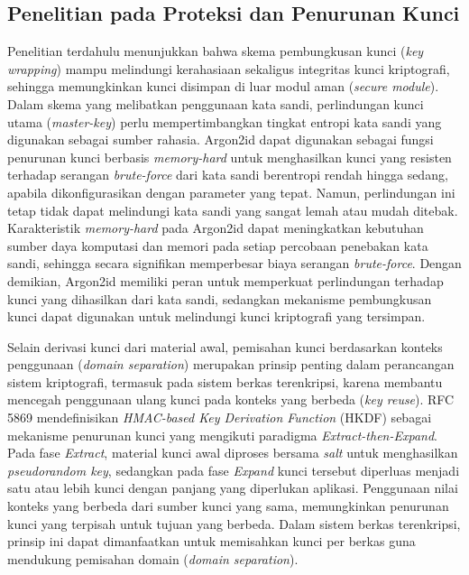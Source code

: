 \subsection{Penelitian pada Proteksi dan Penurunan Kunci}
Penelitian terdahulu menunjukkan bahwa skema pembungkusan kunci (\textit{key wrapping}) mampu melindungi kerahasiaan sekaligus integritas kunci kriptografi, sehingga memungkinkan kunci disimpan di luar modul aman (\textit{secure module})\cite{KeyBlob,cryptoeprint:2022/1499}. Dalam skema yang melibatkan penggunaan kata sandi, perlindungan kunci utama (\textit{master-key}) perlu mempertimbangkan tingkat entropi kata sandi yang digunakan sebagai sumber rahasia. Argon2id\cite{RFC9106} dapat digunakan sebagai fungsi penurunan kunci berbasis \textit{memory-hard} untuk menghasilkan kunci yang resisten terhadap serangan \textit{brute-force} dari kata sandi berentropi rendah hingga sedang, apabila dikonfigurasikan dengan parameter yang tepat. Namun, perlindungan ini tetap tidak dapat melindungi kata sandi yang sangat lemah atau mudah ditebak\cite{Tippe2025Evaluating}. Karakteristik \textit{memory-hard} pada Argon2id dapat meningkatkan kebutuhan sumber daya komputasi dan memori pada setiap percobaan penebakan kata sandi, sehingga secara signifikan memperbesar biaya serangan \textit{brute-force}\cite{Fedorchenko2024PASSWORD,coignard2025qatsistatelesssecretgeneration}. Dengan demikian, Argon2id memiliki peran untuk memperkuat perlindungan terhadap kunci yang dihasilkan dari kata sandi, sedangkan mekanisme pembungkusan kunci dapat digunakan untuk melindungi kunci kriptografi yang tersimpan.

Selain derivasi kunci dari material awal, pemisahan kunci berdasarkan konteks penggunaan (\textit{domain separation}) merupakan prinsip penting dalam perancangan sistem kriptografi, termasuk pada sistem berkas terenkripsi, karena membantu mencegah penggunaan ulang kunci pada konteks yang berbeda (\textit{key reuse})\cite{Sun2026Tilewise}. RFC 5869\cite{RFC5869} mendefinisikan \textit{HMAC-based Key Derivation Function} (HKDF) sebagai mekanisme penurunan kunci yang mengikuti paradigma \textit{Extract-then-Expand}. Pada fase \textit{Extract}, material kunci awal diproses bersama \textit{salt} untuk menghasilkan \textit{pseudorandom key}, sedangkan pada fase \textit{Expand} kunci tersebut diperluas menjadi satu atau lebih kunci dengan panjang yang diperlukan aplikasi. Penggunaan nilai konteks yang berbeda dari sumber kunci yang sama, memungkinkan penurunan kunci yang terpisah untuk tujuan yang berbeda\cite{Sun2026Tilewise}. Dalam sistem berkas terenkripsi, prinsip ini dapat dimanfaatkan untuk memisahkan kunci per berkas guna mendukung pemisahan domain (\textit{domain separation}).

